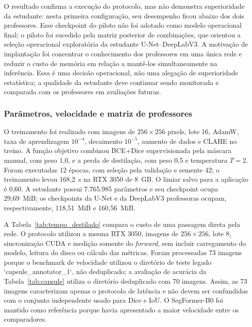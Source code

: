 \documentclass[12pt]{article}
\begin{document}
O resultado confirma a execução do protocolo, mas não demonstra superioridade
da estudante: nesta primeira configuração, seu desempenho ficou abaixo dos dois
professores. Esse checkpoint do piloto não foi adotado como modelo operacional
final; o piloto foi sucedido pela matriz posterior de combinações, que orientou
a seleção operacional exploratória da estudante U-Net--DeepLabV3. A motivação
de implantação foi concentrar o conhecimento dos professores em uma única rede
e reduzir o custo de memória em relação a mantê-los simultaneamente na
inferência. Essa é uma decisão operacional, não uma alegação de superioridade
estatística; a qualidade da estudante deve continuar sendo monitorada e
comparada com os professores em avaliações futuras.

\subsubsection{Parâmetros, velocidade e matriz de professores}
O treinamento foi realizado com imagens de $256\times256$ pixels, lote 16,
AdamW, taxa de aprendizagem $10^{-4}$, decaimento $10^{-5}$, aumento de dados e
CLAHE no treino. A função objetivo combinou BCE+Dice supervisionada pela
máscara manual, com peso 1,0, e a perda de destilação, com peso 0,5 e
temperatura $T=2$. Foram executadas 12 épocas, com seleção pela validação e
semente 42; o treinamento levou 168,2~s na RTX 3050 de 8~GB. O limiar salvo
para a aplicação é 0,60. A estudante possui 7.765.985 parâmetros e seu
checkpoint ocupa 29,69~MiB; os checkpoints da U-Net e da DeepLabV3 professoras
ocupam, respectivamente, 118,51~MiB e 160,56~MiB.

A Tabela~\ref{tab:tempo_destilado} compara o custo de uma passagem direta
pela rede. O protocolo utilizou a mesma RTX 3050, imagens de $256\times256$,
lote 8, sincronização CUDA e medição somente do \textit{forward}, sem incluir
carregamento do modelo, leitura do disco ou cálculo das métricas. Foram
processadas 73 imagens porque o benchmark de velocidade utilizou o diretório
de teste legado `capsule\_annotator\_1`, não deduplicado; a avaliação de
acurácia da Tabela~\ref{tab:capsule} utiliza o diretório deduplicado com 70
imagens. Assim, as 73 imagens caracterizam apenas o protocolo de latência e
não devem ser confundidas com o conjunto independente usado para Dice e IoU.
O SegFormer-B0 foi mantido como referência porque havia apresentado a maior
velocidade entre os comparadores.
\end{document}
